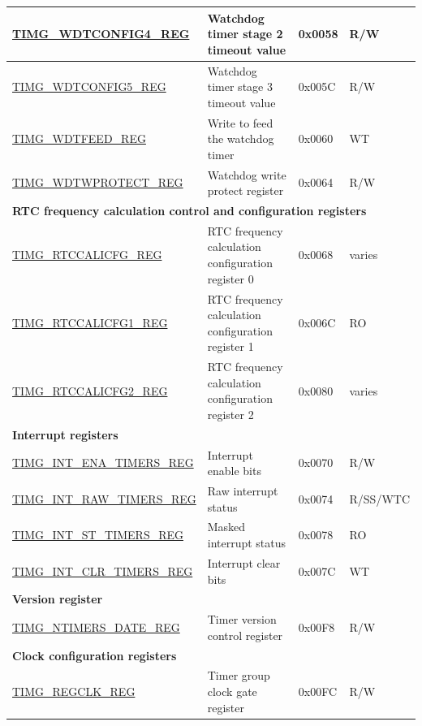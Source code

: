 \begin{longtable}{ | p{6cm} | p{6.7cm} | p{1.3cm} | p{1.5cm} | }
\hyperref[regdesc:TIMGWDTCONFIG4REG]{TIMG\_WDTCONFIG4\_REG} & Watchdog timer stage 2 timeout value & 0x0058 & R/W \\ \hline
\hyperref[regdesc:TIMGWDTCONFIG5REG]{TIMG\_WDTCONFIG5\_REG} & Watchdog timer stage 3 timeout value & 0x005C & R/W \\ \hline
\hyperref[regdesc:TIMGWDTFEEDREG]{TIMG\_WDTFEED\_REG} & Write to feed the watchdog timer & 0x0060 & WT \\ \hline
\hyperref[regdesc:TIMGWDTWPROTECTREG]{TIMG\_WDTWPROTECT\_REG} & Watchdog write protect register & 0x0064 & R/W \\ \hline
\multicolumn{4}{|l|}{\textbf{RTC frequency calculation control and configuration registers}} \\ \hline
\hyperref[regdesc:TIMGRTCCALICFGREG]{TIMG\_RTCCALICFG\_REG} & RTC frequency calculation configuration register 0 & 0x0068 & varies \\ \hline
\hyperref[regdesc:TIMGRTCCALICFG1REG]{TIMG\_RTCCALICFG1\_REG} & RTC frequency calculation configuration register 1 & 0x006C & RO \\ \hline
\hyperref[regdesc:TIMGRTCCALICFG2REG]{TIMG\_RTCCALICFG2\_REG} & RTC frequency calculation configuration register 2 & 0x0080 & varies \\ \hline
\multicolumn{4}{|l|}{\textbf{Interrupt registers}} \\ \hline
\hyperref[regdesc:TIMGINTENATIMERSREG]{TIMG\_INT\_ENA\_TIMERS\_REG} & Interrupt enable bits & 0x0070 & R/W \\ \hline
\hyperref[regdesc:TIMGINTRAWTIMERSREG]{TIMG\_INT\_RAW\_TIMERS\_REG} & Raw interrupt status & 0x0074 & R/SS/WTC \\ \hline
\hyperref[regdesc:TIMGINTSTTIMERSREG]{TIMG\_INT\_ST\_TIMERS\_REG} & Masked interrupt status & 0x0078 & RO \\ \hline
\hyperref[regdesc:TIMGINTCLRTIMERSREG]{TIMG\_INT\_CLR\_TIMERS\_REG} & Interrupt clear bits & 0x007C & WT \\ \hline
\multicolumn{4}{|l|}{\textbf{Version register}} \\ \hline
\hyperref[regdesc:TIMGNTIMERSDATEREG]{TIMG\_NTIMERS\_DATE\_REG} & Timer version control register & 0x00F8 & R/W \\ \hline
\multicolumn{4}{|l|}{\textbf{Clock configuration registers}} \\ \hline
\hyperref[regdesc:TIMGREGCLKREG]{TIMG\_REGCLK\_REG} & Timer group clock gate register & 0x00FC & R/W \\ \hline
\end{longtable}
